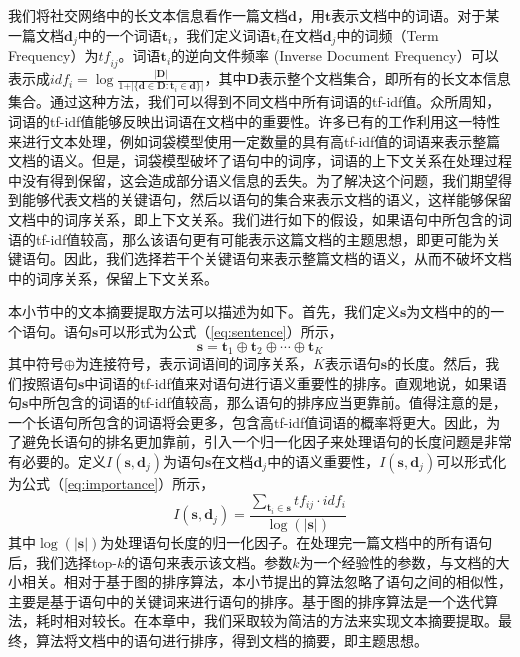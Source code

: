 我们将社交网络中的长文本信息看作一篇文档$\mathbf{d}$，用$\mathbf{t}$表示文档中的词语。对于某一篇文档$\mathbf{d}_j$中的一个词语$\mathbf{t}_i$，我们定义词语$\mathbf{t}_i$在文档$\mathbf{d}_j$中的词频（Term Frequency）为${\textit{tf}}_{ij}$。词语$\mathbf{t}_i$的逆向文件频率 (Inverse Document Frequency）可以表示成${idf}_i = \log \frac{\vert \mathbf{D} \vert}{1 + \vert \{\mathbf{d} \in \mathbf{D} : \mathbf{t}_i \in \mathbf{d}\}\vert}$，其中$\mathbf{D}$表示整个文档集合，即所有的长文本信息集合。通过这种方法，我们可以得到不同文档中所有词语的tf-idf值。众所周知，词语的tf-idf值能够反映出词语在文档中的重要性。许多已有的工作利用这一特性来进行文本处理，例如词袋模型使用一定数量的具有高tf-idf值的词语来表示整篇文档的语义。但是，词袋模型破坏了语句中的词序，词语的上下文关系在处理过程中没有得到保留，这会造成部分语义信息的丢失。为了解决这个问题，我们期望得到能够代表文档的关键语句，然后以语句的集合来表示文档的语义，这样能够保留文档中的词序关系，即上下文关系。我们进行如下的假设，如果语句中所包含的词语的tf-idf值较高，那么该语句更有可能表示这篇文档的主题思想，即更可能为关键语句。因此，我们选择若干个关键语句来表示整篇文档的语义，从而不破坏文档中的词序关系，保留上下文关系。

本小节中的文本摘要提取方法可以描述为如下。首先，我们定义$\mathbf{s}$为文档中的的一个语句。语句$\mathbf{s}$可以形式为公式（\ref{eq:sentence}）所示，
\begin{equation}
\label{eq:sentence}
	\mathbf{s}=\mathbf{t}_1 \oplus \mathbf{t}_2 \oplus \cdots \oplus \mathbf{t}_K
\end{equation}
其中符号$\oplus$为连接符号，表示词语间的词序关系，$K$表示语句$\mathbf{s}$的长度。然后，我们按照语句$\mathbf{s}$中词语的tf-idf值来对语句进行语义重要性的排序。直观地说，如果语句$\mathbf{s}$中所包含的词语的tf-idf值较高，那么语句的排序应当更靠前。值得注意的是，一个长语句所包含的词语将会更多，包含高tf-idf值词语的概率将更大。因此，为了避免长语句的排名更加靠前，引入一个归一化因子来处理语句的长度问题是非常有必要的。定义$I(\mathbf{s}, \mathbf{d}_j)$为语句$\mathbf{s}$在文档$\mathbf{d}_j$中的语义重要性，$I(\mathbf{s}, \mathbf{d}_j)$可以形式化为公式（\ref{eq:importance}）所示，
\begin{equation}
\label{eq:importance}
	I(\mathbf{s}, \mathbf{d}_j)=\frac{\sum \nolimits_{\mathbf{t}_i \in \mathbf{s}} {tf}_{ij}\cdot{idf}_i }{\log \left(\vert\mathbf{s}\vert\right)}
\end{equation}
其中$\log \left(\vert\mathbf{s}\vert\right)$为处理语句长度的归一化因子。在处理完一篇文档中的所有语句后，我们选择top-$k$的语句来表示该文档。参数$k$为一个经验性的参数，与文档的大小相关。相对于基于图的排序算法，本小节提出的算法忽略了语句之间的相似性，主要是基于语句中的关键词来进行语句的排序。基于图的排序算法是一个迭代算法，耗时相对较长。在本章中，我们采取较为简洁的方法来实现文本摘要提取。最终，算法将文档中的语句进行排序，得到文档的摘要，即主题思想。

